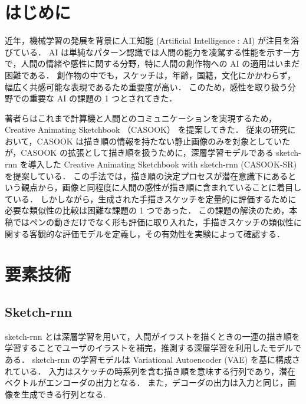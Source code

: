 \documentclass[twocolumn]{jarticle}     %
\begin{document}


\section{はじめに}

%
%

  近年，機械学習の発展を背景に人工知能 (Artificial Intelligence : AI) が注目を浴びている．
  AI は単純なパターン認識では人間の能力を凌駕する性能を示す一方で，人間の情緒や感性に関する分野，特に人間の創作物への AI の適用はいまだ困難である．
  創作物の中でも，スケッチは，年齢，国籍，文化にかかわらず，幅広く共感可能な表現であるため重要度が高い．
  このため，感性を取り扱う分野での重要な AI の課題の 1 つとされてきた．\par

  著者らはこれまで計算機と人間とのコミュニケーションを実現するため，Creative Animating Sketchbook （CASOOK） を提案してきた．
  従来の研究において，CASOOK は描き順の情報を持たない静止画像のみを対象としていたが，CASOOK の拡張として描き順を扱うために，深層学習モデルである sketch-rnn \cite{DBLP:journals/corr/HaE17} を導入した Creative Animating Sketchbook with sketch-rnn (CASOOK-SR) を提案している．
  この手法では，描き順の決定プロセスが潜在意識下にあるという観点から，画像と同程度に人間の感性が描き順に含まれていることに着目している．
  しかしながら，生成された手描きスケッチを定量的に評価するために必要な類似性の比較は困難な課題の 1 つであった．
  この課題の解決のため，本稿ではペンの動きだけでなく形も評価に取り入れた，手描きスケッチの類似性に関する客観的な評価モデルを定義し，その有効性を実験によって確認する．


\section{要素技術}

  \subsection{Sketch-rnn}	\label{tau}
    sketch-rnn とは深層学習を用いて，人間がイラストを描くときの一連の描き順を学習することでユーザのイラストを補完，推測する深層学習を利用したモデルである．
    sketch-rnn の学習モデルは Variational Autoencoder (VAE) を基に構成されている．
    入力はスケッチの時系列を含む描き順を意味する行列であり，潜在ベクトルがエンコーダの出力となる．
    また，デコーダの出力は入力と同じ，画像を生成できる行列となる.
\end{document}

